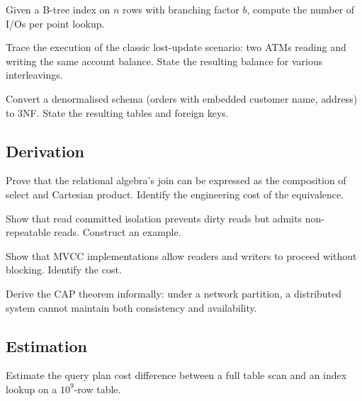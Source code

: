 \begin{exercise}
Given a B-tree index on $n$ rows with branching factor $b$, compute the number of I/Os per point lookup.
\end{exercise}

\begin{exercise}
Trace the execution of the classic lost-update scenario: two ATMs reading and writing the same account balance. State the resulting balance for various interleavings.
\end{exercise}

\begin{exercise}
Convert a denormalised schema (orders with embedded customer name, address) to 3NF. State the resulting tables and foreign keys.
\end{exercise}

\subsection*{Derivation}

\begin{exercise}
Prove that the relational algebra's join can be expressed as the composition of select and Cartesian product. Identify the engineering cost of the equivalence.
\end{exercise}

\begin{exercise}
Show that read committed isolation prevents dirty reads but admits non-repeatable reads. Construct an example.
\end{exercise}

\begin{exercise}
Show that MVCC implementations allow readers and writers to proceed without blocking. Identify the cost.
\end{exercise}

\begin{exercise}
Derive the CAP theorem informally: under a network partition, a distributed system cannot maintain both consistency and availability.
\end{exercise}

\subsection*{Estimation}

\begin{exercise}
Estimate the query plan cost difference between a full table scan and an index lookup on a $10^9$-row table.
\end{exercise}

